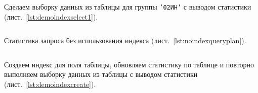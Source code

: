 \documentclass[14pt]{extarticle}
\begin{document}
\begin{listing}[!htpb]
  \caption{Создаем и заполняем демонстрационную таблицу \texttt{sgroup}\label{lst:crandinsdemo}}  
  \inputminted{postgresql}{list/demoindexadd.txt}  
\end{listing}


Сделаем выборку данных из таблицы для группы \texttt{'02ИН'} с выводом статистики (лист.~\ref{lst:demoindexselect1}).

\begin{listing}[!htpb]
  \caption{Выборка данных из таблицы \texttt{sgroup} (без индекса)\label{lst:demoindexselect1}}
  \inputminted{postgresql}{list/demoindexselect1.txt}
\end{listing}

Статистика запроса без использования индекса (лист.~\ref{lst:noindexqueryplan}).

\begin{listing}[!htpb]
  \caption{Статистика запроса (без индекса)\label{lst:noindexqueryplan}}
  \inputminted{postgresql}{list/noindexqueryplan.txt}
\end{listing}

Создаем индекс для поля таблицы, обновляем статистику по таблице и повторно выполняем выборку данных из таблицы с выводом статистики (лист.~\ref{lst:demoindexcreate}).

\begin{listing}[!htpb]
  \caption{Создание индекса, обновление статистики по таблице, выборка данных из таблицы (с использованием индекса)\label{lst:demoindexcreate}}
  \inputminted{postgresql}{list/demoindexcreate.txt}
\end{listing}
\end{document}
